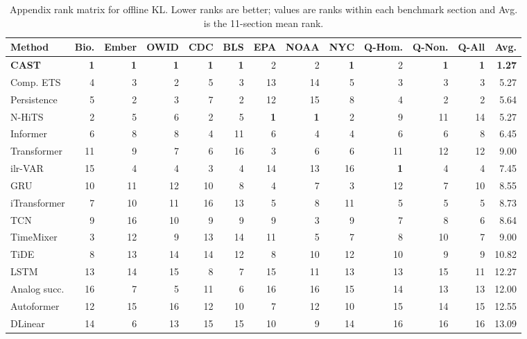 
\begin{table}[t]
\centering
\caption{Appendix rank matrix for offline KL. Lower ranks are better; values are ranks within each benchmark section and Avg. is the 11-section mean rank.}
\label{tab:appendix-offline-kl-rank-matrix}
\scriptsize
\setlength{\tabcolsep}{2.4pt}
\begin{tabular}{@{}lrrrrrrrrrrrr@{}}
\toprule
Method & Bio. & Ember & OWID & CDC & BLS & EPA & NOAA & NYC & Q-Hom. & Q-Non. & Q-All & Avg. \\
\midrule
\textbf{CAST} & \textbf{1} & \textbf{1} & \textbf{1} & \textbf{1} & \textbf{1} & 2 & 2 & \textbf{1} & 2 & \textbf{1} & \textbf{1} & \textbf{1.27} \\
Comp. ETS & 4 & 3 & 2 & 5 & 3 & 13 & 14 & 5 & 3 & 3 & 3 & 5.27 \\
Persistence & 5 & 2 & 3 & 7 & 2 & 12 & 15 & 8 & 4 & 2 & 2 & 5.64 \\
N-HiTS & 2 & 5 & 6 & 2 & 5 & \textbf{1} & \textbf{1} & 2 & 9 & 11 & 14 & 5.27 \\
Informer & 6 & 8 & 8 & 4 & 11 & 6 & 4 & 4 & 6 & 6 & 8 & 6.45 \\
Transformer & 11 & 9 & 7 & 6 & 16 & 3 & 6 & 6 & 11 & 12 & 12 & 9.00 \\
ilr-VAR & 15 & 4 & 4 & 3 & 4 & 14 & 13 & 16 & \textbf{1} & 4 & 4 & 7.45 \\
GRU & 10 & 11 & 12 & 10 & 8 & 4 & 7 & 3 & 12 & 7 & 10 & 8.55 \\
iTransformer & 7 & 10 & 11 & 16 & 13 & 5 & 8 & 11 & 5 & 5 & 5 & 8.73 \\
TCN & 9 & 16 & 10 & 9 & 9 & 9 & 3 & 9 & 7 & 8 & 6 & 8.64 \\
TimeMixer & 3 & 12 & 9 & 13 & 14 & 11 & 5 & 7 & 8 & 10 & 7 & 9.00 \\
TiDE & 8 & 13 & 14 & 14 & 12 & 8 & 10 & 12 & 10 & 9 & 9 & 10.82 \\
LSTM & 13 & 14 & 15 & 8 & 7 & 15 & 11 & 13 & 13 & 15 & 11 & 12.27 \\
Analog succ. & 16 & 7 & 5 & 11 & 6 & 16 & 16 & 15 & 14 & 13 & 13 & 12.00 \\
Autoformer & 12 & 15 & 16 & 12 & 10 & 7 & 12 & 10 & 15 & 14 & 15 & 12.55 \\
DLinear & 14 & 6 & 13 & 15 & 15 & 10 & 9 & 14 & 16 & 16 & 16 & 13.09 \\
\bottomrule
\end{tabular}
\end{table}

